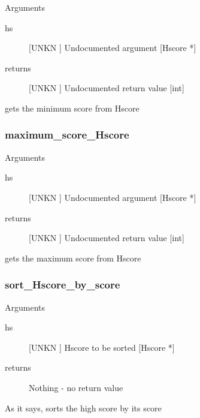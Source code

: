 Arguments
\begin{description}
\item[hs] [UNKN ] Undocumented argument [Hscore *]
\item[returns] [UNKN ] Undocumented return value [int]
\end{description}
gets the minimum score from Hscore


\subsubsection{maximum_score_Hscore}

Arguments
\begin{description}
\item[hs] [UNKN ] Undocumented argument [Hscore *]
\item[returns] [UNKN ] Undocumented return value [int]
\end{description}
gets the maximum score from Hscore


\subsubsection{sort_Hscore_by_score}

Arguments
\begin{description}
\item[hs] [UNKN ] Hscore to be sorted [Hscore *]
\item[returns] Nothing - no return value
\end{description}
As it says, sorts the high score by its score



